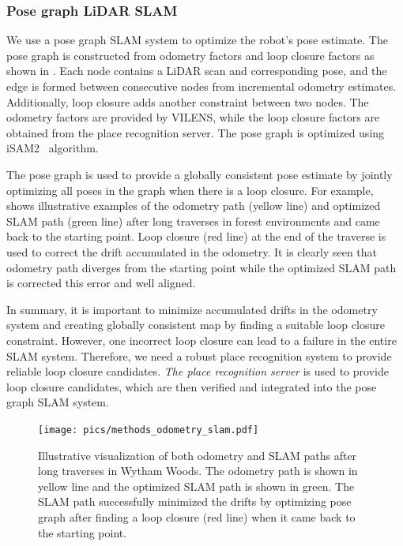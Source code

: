 \subsubsection*{\textbf{Pose graph LiDAR SLAM}}  We use a pose graph SLAM system to optimize the robot's pose estimate. The pose graph is constructed from odometry factors and loop closure factors as shown in . Each node contains a LiDAR scan and corresponding pose, and the edge is formed between consecutive nodes from incremental odometry estimates. Additionally, loop closure adds another constraint between two nodes. The odometry factors are provided by VILENS, while the loop closure factors are obtained from the place recognition server. The pose graph is optimized using iSAM2~\cite{Kaess2012} algorithm. 

The pose graph is used to provide a globally consistent pose estimate by jointly optimizing all poses in the graph when there is a loop closure. For example,  shows illustrative examples of the odometry path (yellow line) and optimized SLAM path (green line) after long traverses in forest environments and came back to the starting point. Loop closure (red line) at the end of the traverse is used to correct the drift accumulated in the odometry. It is clearly seen that odometry path diverges from the starting point while the optimized SLAM path is corrected this error and well aligned.

In summary, it is important to minimize accumulated drifts in the odometry system and creating globally consistent map by finding a suitable loop closure constraint. However, one incorrect loop closure can lead to a failure in the entire SLAM system. Therefore, we need a robust place recognition system to provide reliable loop closure candidates. \emph{The place recognition server} is used to provide loop closure candidates, which are then verified and integrated into the pose graph SLAM system.

\begin{figure}[htbp]
  \centering
  \texttt{[image: pics/methods\_odometry\_slam.pdf]}
  \caption{Illustrative visualization of both odometry and SLAM paths after long traverses in Wytham Woods. The odometry path is shown in yellow line and the optimized SLAM path is shown in green. The SLAM path successfully minimized the drifts by optimizing pose graph after finding a loop closure (red line) when it came back to the starting point.}
  \label{fig:odometry_slam}
\end{figure}


